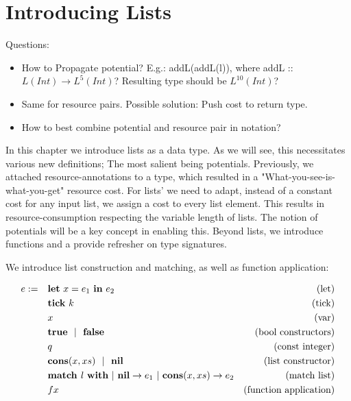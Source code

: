 \chapter{Introducing Lists}

Questions:
\begin{itemize}
   \item How to Propagate potential? E.g.: addL(addL(l)), where addL :: \(L(Int) \to L^5(Int)\)? Resulting type should be \(L^{10}(Int)\)?
   \item Same for resource pairs. Possible solution: Push cost to return type.
   \item How to best combine potential and resource pair in notation? 
\end{itemize}

In this chapter we introduce lists as a data type. As we will see, this necessitates various new definitions; The most salient being potentials. Previously, we attached resource-annotations to a type, which resulted in a "What-you-see-is-what-you-get" resource cost. For lists' we need to adapt, instead of a constant cost for any input list, we assign a cost to every list element. This results in resource-consumption respecting the variable length of lists. The notion of potentials will be a key concept in enabling this. Beyond lists, we introduce functions and a provide refresher on type signatures.

We introduce list construction and matching, as well as function application:


\begin{definition}
   \label{def:prog-lang-6}

\begin{align*}
   e := ~~~ & \mathbf{let}~x = e_1~\mathbf{in}~e_2		& \text{(let)}\\
            & \mathbf{tick}~k				& \text{(tick)}\\
	    & x					& \text{(var)}\\
	    & \mathbf{true} ~~| ~~\mathbf{false}		& \text{(bool constructors)}\\
	    & q					& \text{(const integer)}\\
            & \textbf{cons}(x, xs) ~~| ~~ \textbf{nil}      & \text{(list constructor)}\\
            & \textbf{match } l~\textbf{with}~|~\textbf{nil} \to e_1~|~\textbf{cons}(x, xs) \to e_2           & \text{(match list)}\\
            & f x                               & \text{(function application)}\\
\end{align*}
\end{definition}

